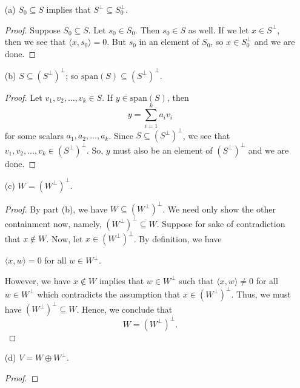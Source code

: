 \begin{enumerate}
    \item[(a)] \( {S}_{0} \subseteq S  \) implies that \( S^{\perp} \subseteq {S}_{0}^{\perp} \).
        \begin{proof}
            Suppose \( {S}_{0} \subseteq S \). Let \( {s}_{0} \in {S}_{0} \). Then \( {s}_{0} \in S  \) as well. If we let \( x \in S^{\perp} \), then  we see that \( \langle x ,  {s}_0  \rangle = 0  \). But \( {s}_{0} \) in an element of \( {S}_{0} \), so \( x \in {S}_{0}^{\perp} \) and we are done.  
        \end{proof}
    \item[(b)] \( S \subseteq (S^{\perp})^{\perp} \); so \( \text{span}(S) \subseteq (S^{\perp})^{\perp} \).
        \begin{proof}
        Let \( {v}_{1}, {v}_{2}, \dots, {v}_{k} \in S  \). If \( y \in \text{span}(S) \), then 
        \[  y = \sum_{ i=1  }^{  k  } {a}_{i} {v}_{i}  \]
        for some scalars \( {a}_{1}, {a}_{2}, \dots, {a}_{k }  \). Since \( S \subseteq (S^\perp)^{\perp} \), we see that \( {v}_{1}, {v}_{2}, \dots, {v}_{k} \in (S^{\perp})^{\perp} \). So, \( y  \) must also be an element of \( (S^{\perp})^{\perp} \) and we are done.
        \end{proof}
    \item[(c)] \( W = (W^{\perp})^{\perp} \).
        \begin{proof}
        By part (b), we have \( W \subseteq (W^{\perp})^{\perp} \). We need only show the other containment now, namely, \( (W^{\perp})^{\perp} \subseteq W  \). Suppose for sake of contradiction that \( x \notin W  \). Now, let \( x \in (W^{\perp})^{\perp} \). By definition, we have   
        \begin{center}
            \( \langle x , w \rangle = 0   \) for all \( w \in W^{\perp} \).
        \end{center}
        However, we have \( x \notin W  \) implies that \( w \in W^{\perp} \) such that \( \langle x , w \rangle \neq 0  \) for all \( w \in W^{\perp} \) which contradicts the assumption that \( x \in (W^{\perp})^{\perp}  \). Thus, we must have \( (W^{\perp})^{\perp} \subseteq W  \). Hence, we conclude that 
        \[   W = (W^{\perp})^{\perp}.  \]
        \end{proof}
    \item[(d)] \( V = W \oplus W^{\perp} \).
        \begin{proof}
        
        \end{proof}
\end{enumerate}

